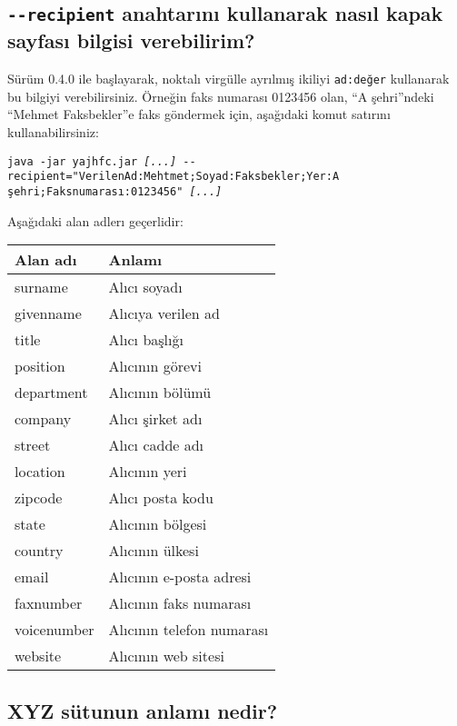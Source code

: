 \documentclass[a4paper,10pt]{scrartcl}
\begin{document}
\subsection{ \texttt{-{-}recipient} anahtarını kullanarak nasıl kapak sayfası bilgisi verebilirim?}

Sürüm 0.4.0 ile başlayarak, noktalı virgülle ayrılmış ikiliyi \texttt{ad:değer} kullanarak bu bilgiyi verebilirsiniz.
Örneğin faks numarası 0123456 olan, ``A şehri''ndeki ``Mehmet Faksbekler''e faks göndermek için, aşağıdaki komut satırını kullanabilirsiniz:

\texttt{java -jar yajhfc.jar \textit{[...]} -{-}recipient="VerilenAd:Mehtmet;Soyad:Faksbekler;Yer:A şehri;Faksnumarası:0123456" \textit{[...]}}

Aşağıdaki alan adlerı geçerlidir:
\begin{center}
\begin{tabular}{|l|p{}|}
\hline
\bfseries Alan adı & \bfseries Anlamı \\
\hline\hline
\ttfamily surname & Alıcı soyadı\\\hline
\ttfamily givenname & Alıcıya verilen ad \\\hline
\ttfamily title & Alıcı başlığı \\\hline
\ttfamily position & Alıcının görevi \\\hline
\ttfamily department & Alıcının bölümü\\\hline
\ttfamily company & Alıcı şirket adı\\\hline
\ttfamily street & Alıcı cadde adı \\\hline
\ttfamily location & Alıcının yeri\\\hline
\ttfamily zipcode & Alıcı posta kodu \\\hline
\ttfamily state & Alıcının bölgesi\\\hline
\ttfamily country & Alıcının ülkesi\\\hline
\ttfamily email & Alıcının e-posta adresi\\\hline
\ttfamily faxnumber & Alıcının faks numarası \\\hline
\ttfamily voicenumber & Alıcının telefon numarası \\\hline
\ttfamily website & Alıcının web sitesi\\\hline
\end{tabular}
\end{center}

\subsection{XYZ sütunun anlamı nedir?}
\end{document}

